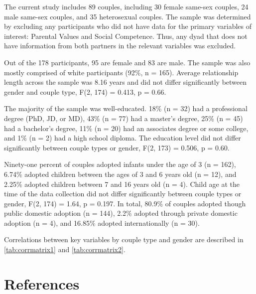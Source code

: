 \documentclass[man]{apa6}
\begin{document}
The current study includes 89 couples, including 30 female same-sex couples, 24 male same-sex couples, and 35 heterosexual couples. The sample was determined by excluding any participants who did not have data for the primary variables of interest: Parental Values and Social Competence. Thus, any dyad that does not have information from both partners in the relevant variables was excluded.

Out of the 178 participants, 95 are female and 83 are male. The sample was also mostly comprised of white participants (92\%, n = 165). Average relationship length across the sample was 8.16 years and did not differ significantly between gender and couple type, F(2, 174) = 0.413, p = 0.66.

The majority of the sample was well-educated. 18\% (n = 32) had a professional degree (PhD, JD, or MD), 43\% (n = 77) had a master's degree, 25\% (n = 45) had a bachelor's degree, 11\% (n = 20) had an associates degree or some college, and 1\% (n = 2) had a high school diploma. The education level did not differ significantly between couple types or gender, F(2, 173) = 0.506, p = 0.60.

Ninety-one percent of couples adopted infants under the age of 3 (n = 162), 6.74\% adopted children between the ages of 3 and 6 years old (n = 12), and 2.25\% adopted children between 7 and 16 years old (n = 4). Child age at the time of the data collection did not differ significantly between couple types or gender, F(2, 174) = 1.64, p = 0.197. In total, 80.9\% of couples adopted though public domestic adoption (n = 144), 2.2\% adopted through private domestic adoption (n = 4), and 16.85\% adopted internationally (n = 30).

Correlations between key variables by couple type and gender are described in \ref{tab:corrmatrix1} and \ref{tab:corrmatrix2}.

\newpage

\hypertarget{references}{%
\section{References}\label{references}}

\begingroup
\setlength{\parindent}{-0.5in}
\setlength{\leftskip}{0.5in}

\hypertarget{refs}{}

\endgroup
\end{document}
